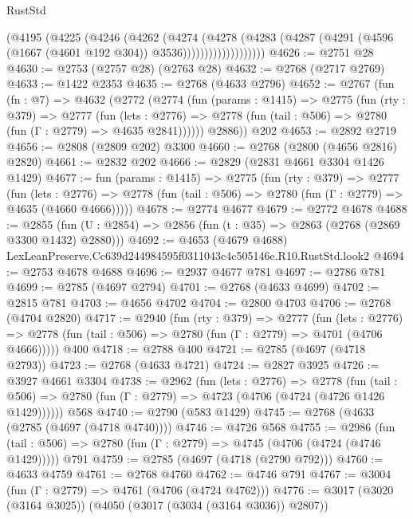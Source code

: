 \begin{lexlean}{RustStd}
\begin{coremodule}
                      (@4195
                        (@4225
                          (@4246
                            (@4262
                              (@4274
                                (@4278
                                  (@4283
                                    (@4287
                                      (@4291
                                        (@4596 (@1667 (@4601 @192 @304)) @3536)))))))))))))))))))
@4626 := @2751 @28
@4630 := @2753 (@2757 @28) (@2763 @28)
@4632 := @2768 (@2717 @2769)
@4633 := @1422 @2353
@4635 := @2768 (@4633 @2796)
@4652 := @2767
    (fun (fn : @7) =>
    @4632
      (@2772
        (@2774
          (fun (params : @1415) =>
          @2775
            (fun (rty : @379) =>
            @2777
              (fun (lets : @2776) =>
              @2778 (fun (tail : @506) => @2780 (fun (Γ : @2779) => @4635 @2841))))))
        @2886))
    @202
@4653 := @2892 @2719
@4656 := @2808 (@2809 @202) @3300
@4660 := @2768 (@2800 (@4656 @2816) @2820)
@4661 := @2832 @202
@4666 := @2829 (@2831 @4661 @3304 @1426 @1429)
@4677 := fun (params : @1415) =>
  @2775
    (fun (rty : @379) =>
    @2777
      (fun (lets : @2776) =>
      @2778 (fun (tail : @506) => @2780 (fun (Γ : @2779) => @4635 (@4660 @4666)))))
@4678 := @2774 @4677
@4679 := @2772 @4678
@4688 := @2855 (fun (U : @2854) => @2856 (fun (t : @35) => @2863 (@2768 (@2869 @3300 @1432) @2880)))
@4692 := @4653 (@4679 @4688) LexLeanPreserve.Cc639d244984595f0311043c4c505146e.R10.RustStd.look2
@4694 := @2753 @4678 @4688
@4696 := @2937 @4677 @781
@4697 := @2786 @781
@4699 := @2785 (@4697 @2794)
@4701 := @2768 (@4633 @4699)
@4702 := @2815 @781
@4703 := @4656 @4702
@4704 := @2800 @4703
@4706 := @2768 (@4704 @2820)
@4717 := @2940
    (fun (rty : @379) =>
    @2777
      (fun (lets : @2776) =>
      @2778 (fun (tail : @506) => @2780 (fun (Γ : @2779) => @4701 (@4706 @4666)))))
    @400
@4718 := @2788 @400
@4721 := @2785 (@4697 (@4718 @2793))
@4723 := @2768 (@4633 @4721)
@4724 := @2827 @3925
@4726 := @3927 @4661 @3304
@4738 := @2962
    (fun (lets : @2776) =>
    @2778
      (fun (tail : @506) => @2780 (fun (Γ : @2779) => @4723 (@4706 (@4724 (@4726 @1426 @1429))))))
    @568
@4740 := @2790 (@583 @1429)
@4745 := @2768 (@4633 (@2785 (@4697 (@4718 @4740))))
@4746 := @4726 @568
@4755 := @2986
    (fun (tail : @506) => @2780 (fun (Γ : @2779) => @4745 (@4706 (@4724 (@4746 @1429)))))
    @791
@4759 := @2785 (@4697 (@4718 (@2790 @792)))
@4760 := @4633 @4759
@4761 := @2768 @4760
@4762 := @4746 @791
@4767 := @3004 (fun (Γ : @2779) => @4761 (@4706 (@4724 @4762)))
@4776 := @3017 (@3020 (@3164 @3025)) (@4050 (@3017 (@3034 (@3164 @3036)) @2807))

\end{coremodule}
\end{lexlean}
